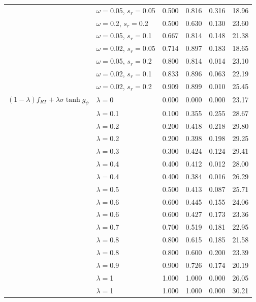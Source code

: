 \begin{table}[H]
\begin{tabular}{llrrrr}
 & $\omega{=}$0.05, $s_r{=}$0.05 & 0.500 & 0.816 & 0.316 & 18.96 \\
 & $\omega{=}$0.2, $s_r{=}$0.2 & 0.500 & 0.630 & 0.130 & 23.60 \\
 & $\omega{=}$0.05, $s_r{=}$0.1 & 0.667 & 0.814 & 0.148 & 21.38 \\
 & $\omega{=}$0.02, $s_r{=}$0.05 & 0.714 & 0.897 & 0.183 & 18.65 \\
 & $\omega{=}$0.05, $s_r{=}$0.2 & 0.800 & 0.814 & 0.014 & 23.10 \\
 & $\omega{=}$0.02, $s_r{=}$0.1 & 0.833 & 0.896 & 0.063 & 22.19 \\
 & $\omega{=}$0.02, $s_r{=}$0.2 & 0.909 & 0.899 & 0.010 & 25.45 \\
\hline
$(1{-}\lambda)f_{RT}+\lambda\sigma\tanh g_\psi$ & $\lambda{=}$0 & 0.000 & 0.000 & 0.000 & 23.17 \\
 & $\lambda{=}$0.1 & 0.100 & 0.355 & 0.255 & 28.67 \\
 & $\lambda{=}$0.2 & 0.200 & 0.418 & 0.218 & 29.80 \\
 & $\lambda{=}$0.2 & 0.200 & 0.398 & 0.198 & 29.25 \\
 & $\lambda{=}$0.3 & 0.300 & 0.424 & 0.124 & 29.41 \\
 & $\lambda{=}$0.4 & 0.400 & 0.412 & 0.012 & 28.00 \\
 & $\lambda{=}$0.4 & 0.400 & 0.384 & 0.016 & 26.29 \\
 & $\lambda{=}$0.5 & 0.500 & 0.413 & 0.087 & 25.71 \\
 & $\lambda{=}$0.6 & 0.600 & 0.445 & 0.155 & 24.06 \\
 & $\lambda{=}$0.6 & 0.600 & 0.427 & 0.173 & 23.36 \\
 & $\lambda{=}$0.7 & 0.700 & 0.519 & 0.181 & 22.95 \\
 & $\lambda{=}$0.8 & 0.800 & 0.615 & 0.185 & 21.58 \\
 & $\lambda{=}$0.8 & 0.800 & 0.600 & 0.200 & 23.39 \\
 & $\lambda{=}$0.9 & 0.900 & 0.726 & 0.174 & 20.19 \\
 & $\lambda{=}$1 & 1.000 & 1.000 & 0.000 & 26.05 \\
 & $\lambda{=}$1 & 1.000 & 1.000 & 0.000 & 30.21 \\
\hline
\end{tabular}

\end{table}

